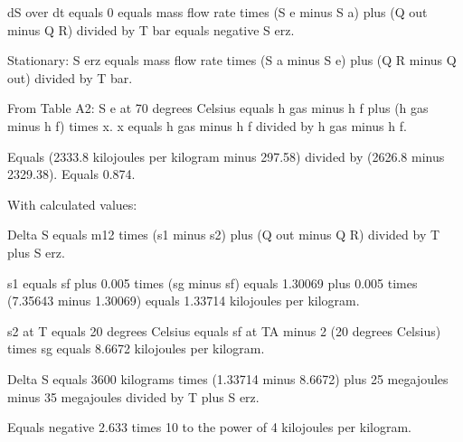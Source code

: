 dS over dt equals 0 equals mass flow rate times (S e minus S a) plus (Q out minus Q R) divided by T bar equals negative S erz.  

Stationary:  
S erz equals mass flow rate times (S a minus S e) plus (Q R minus Q out) divided by T bar.  

From Table A2:  
S e at 70 degrees Celsius equals h gas minus h f plus (h gas minus h f) times x.  
x equals h gas minus h f divided by h gas minus h f.  

Equals (2333.8 kilojoules per kilogram minus 297.58) divided by (2626.8 minus 2329.38).  
Equals 0.874.

With calculated values:  

Delta S equals m12 times (s1 minus s2) plus (Q out minus Q R) divided by T plus S erz.  

s1 equals sf plus 0.005 times (sg minus sf) equals 1.30069 plus 0.005 times (7.35643 minus 1.30069) equals 1.33714 kilojoules per kilogram.  

s2 at T equals 20 degrees Celsius equals sf at TA minus 2 (20 degrees Celsius) times sg equals 8.6672 kilojoules per kilogram.  

Delta S equals 3600 kilograms times (1.33714 minus 8.6672) plus 25 megajoules minus 35 megajoules divided by T plus S erz.  

Equals negative 2.633 times 10 to the power of 4 kilojoules per kilogram.